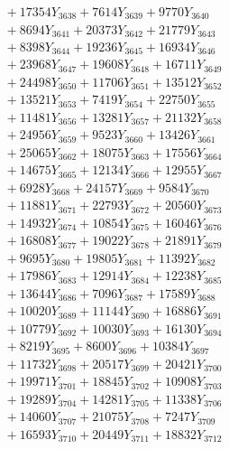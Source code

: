 \documentclass[a4paper,10pt]{article}
\begin{document}
{\begin{align}
&\;  + 17354 Y_{3638} + 7614 Y_{3639} + 9770 Y_{3640} \\[0.3ex]
&\;  + 8694 Y_{3641} + 20373 Y_{3642} + 21779 Y_{3643} \\[0.3ex]
&\;  + 8398 Y_{3644} + 19236 Y_{3645} + 16934 Y_{3646} \\[0.3ex]
&\;  + 23968 Y_{3647} + 19608 Y_{3648} + 16711 Y_{3649} \\[0.3ex]
&\;  + 24498 Y_{3650} + 11706 Y_{3651} + 13512 Y_{3652} \\[0.3ex]
&\;  + 13521 Y_{3653} + 7419 Y_{3654} + 22750 Y_{3655} \\[0.3ex]
&\;  + 11481 Y_{3656} + 13281 Y_{3657} + 21132 Y_{3658} \\[0.5ex]\allowbreak
&\;  + 24956 Y_{3659} + 9523 Y_{3660} + 13426 Y_{3661} \\[0.3ex]
&\;  + 25065 Y_{3662} + 18075 Y_{3663} + 17556 Y_{3664} \\[0.3ex]
&\;  + 14675 Y_{3665} + 12134 Y_{3666} + 12955 Y_{3667} \\[0.3ex]
&\;  + 6928 Y_{3668} + 24157 Y_{3669} + 9584 Y_{3670} \\[0.3ex]
&\;  + 11881 Y_{3671} + 22793 Y_{3672} + 20560 Y_{3673} \\[0.3ex]
&\;  + 14932 Y_{3674} + 10854 Y_{3675} + 16046 Y_{3676} \\[0.3ex]
&\;  + 16808 Y_{3677} + 19022 Y_{3678} + 21891 Y_{3679} \\[0.3ex]
&\;  + 9695 Y_{3680} + 19805 Y_{3681} + 11392 Y_{3682} \\[0.3ex]
&\;  + 17986 Y_{3683} + 12914 Y_{3684} + 12238 Y_{3685} \\[0.3ex]
&\;  + 13644 Y_{3686} + 7096 Y_{3687} + 17589 Y_{3688} \\[0.5ex]\allowbreak
&\;  + 10020 Y_{3689} + 11144 Y_{3690} + 16886 Y_{3691} \\[0.3ex]
&\;  + 10779 Y_{3692} + 10030 Y_{3693} + 16130 Y_{3694} \\[0.3ex]
&\;  + 8219 Y_{3695} + 8600 Y_{3696} + 10384 Y_{3697} \\[0.3ex]
&\;  + 11732 Y_{3698} + 20517 Y_{3699} + 20421 Y_{3700} \\[0.3ex]
&\;  + 19971 Y_{3701} + 18845 Y_{3702} + 10908 Y_{3703} \\[0.3ex]
&\;  + 19289 Y_{3704} + 14281 Y_{3705} + 11338 Y_{3706} \\[0.3ex]
&\;  + 14060 Y_{3707} + 21075 Y_{3708} + 7247 Y_{3709} \\[0.3ex]
&\;  + 16593 Y_{3710} + 20449 Y_{3711} + 18832 Y_{3712} \\[0.3ex]

\end{align}}
\end{document}
